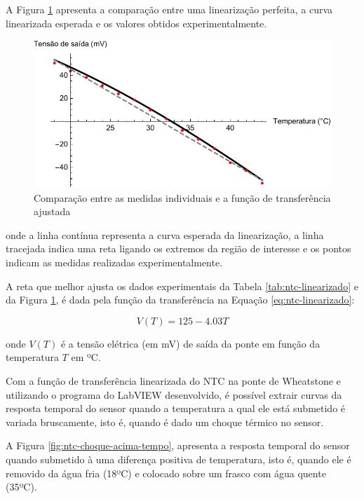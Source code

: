 \documentclass[a4paper]{instrumentacao}
\begin{document}
A Figura \ref{fig:ntc-experimental-comparacao} apresenta a comparação entre uma linearização perfeita, a curva linearizada esperada e os valores obtidos experimentalmente.

\begin{figure}[H]
\center
\includegraphics[width=\textwidth]{NTC-Linear-Obtido.pdf}
\caption{Comparação entre as medidas individuais e a função de transferência ajustada}
\label{fig:ntc-experimental-comparacao}
\end{figure}

\noindent onde a linha contínua representa a curva esperada da linearização, a linha tracejada indica uma reta ligando os extremos da região de interesse e os pontos indicam as medidas realizadas experimentalmente.

A reta que melhor ajusta os dados experimentais da Tabela \ref{tab:ntc-linearizado} e da Figura \ref{fig:ntc-experimental-comparacao}, é dada pela função da transferência na Equação \ref{eq:ntc-linearizado}:


\begin{equation}
	V(T) = 125 - 4.03 T
	\label{eq:ntc-linearizado}
\end{equation}

\noindent onde $V(T)$ é a tensão elétrica (em mV) de saída da ponte em função da temperatura $T$ em ºC.

Com a função de transferência linearizada do NTC na ponte de Wheatstone e utilizando o programa do LabVIEW desenvolvido, é possível extrair curvas da resposta temporal do sensor quando a temperatura a qual ele está submetido é variada bruscamente, isto é, quando é dado um choque térmico no sensor.

A Figura \ref{fig:ntc-choque-acima-tempo}, apresenta a resposta temporal do sensor quando submetido à uma diferença positiva de temperatura, isto é, quando ele é removido da água fria (18ºC) e colocado sobre um frasco com água quente (35ºC).
\end{document}
